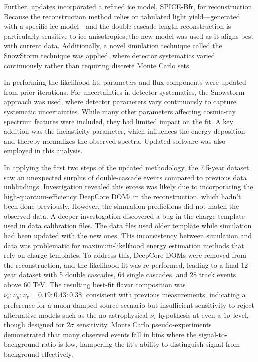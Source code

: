 Further, updates incorporated a refined ice model, SPICE-Bfr, for reconstruction. Because the reconstruction method relies on tabulated light yield—generated with a specific ice model—and the double-cascade length reconstruction is particularly sensitive to ice anisotropies, the new model was used as it aligns best with current data. Additionally, a novel simulation technique called the SnowStorm technique was applied, where detector systematics varied continuously rather than requiring discrete Monte Carlo sets.

In performing the likelihood fit, parameters and flux components were updated from prior iterations. For uncertainties in detector systematics, the Snowstorm approach was used, where detector parameters vary continuously to capture systematic uncertainties. While many other parameters affecting cosmic-ray spectrum features were included, they had limited impact on the fit. A key addition was the inelasticity parameter, which influences the energy deposition and thereby normalizes the observed spectra. Updated software was also employed in this analysis.

In applying the first two steps of the updated methodology, the 7.5-year dataset saw an unexpected surplus of double-cascade events compared to previous data unblindings. Investigation revealed this excess was likely due to incorporating the high-quantum-efficiency DeepCore DOMs in the reconstruction, which hadn’t been done previously. However, the simulation predictions did not match the observed data. A deeper investogation discovered a bug in the charge template used in data calibration files. The data files used older template while simulation had been updated with the new ones. This inconsistency between simulation and data was problematic for maximum-likelihood energy estimation methods that rely on charge templates. To address this, DeepCore DOMs were removed from the reconstruction, and the likelihood fit was re-performed, leading to a final 12-year dataset with 5 double cascades, 64 single cascades, and 28 track events above 60 TeV. The resulting best-fit flavor composition was $\nu_e : \nu_\mu : \nu_\tau=0.19:0.43:0.38$, consistent with previous measurements, indicating a preference for a muon-damped source scenario but insufficient sensitivity to reject alternative models such as the no-astrophysical $\nu_\tau$ hypothesis at even a $1\sigma$ level, though designed for $2\sigma$ sensitivity. Monte Carlo pseudo-experiments demonstrated that many observed events fall in bins where the signal-to-background ratio is low, hampering the fit’s ability to distinguish signal from background effectively.

